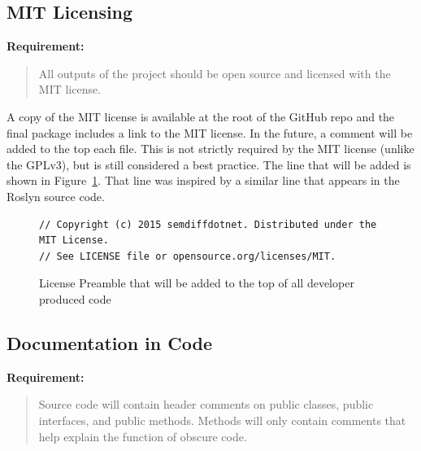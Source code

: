 \documentclass[draftclsnofoot,onecolumn]{IEEEtran}
\begin{document}
\subsection{MIT Licensing}%

\textbf{Requirement:}

\begin{quote}

All outputs of the project should be open source and licensed with the MIT 
license.

\end{quote}

A copy of the MIT license is available at the root of the GitHub repo and the 
final package includes a link to the MIT license. In the future, a comment 
will be added to the top each file. This is not strictly required by the MIT 
license (unlike the GPLv3), but is still considered a best practice. The line 
that will be added is shown in Figure~\ref{mitheader}. That line was inspired 
by a similar line that appears in the Roslyn source code.

\begin{figure}[!t]
\centering
\begin{lstlisting}
// Copyright (c) 2015 semdiffdotnet. Distributed under the MIT License. 
// See LICENSE file or opensource.org/licenses/MIT.
\end{lstlisting}
\caption{License Preamble that will be added to the top of all developer 
produced code}
\label{mitheader}
\end{figure}

\subsection{Documentation in Code}%

\textbf{Requirement:}

\begin{quote}

Source code will contain header comments on public classes, public 
interfaces, and public methods. Methods will only contain comments that help 
explain the function of obscure code.

\end{quote}
\end{document}
